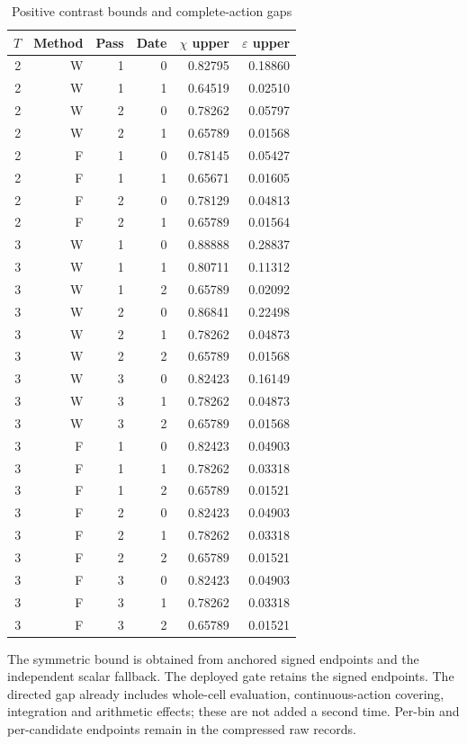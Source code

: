 \begin{table}[htbp]
\centering
\caption{Positive contrast bounds and complete-action gaps}\label{tab:date-bounds54}
{\small\setlength{\tabcolsep}{4pt}
\begin{tabular}{rrrrrr}
\hline
$T$ & Method & Pass & Date & $\chi$ upper & $\varepsilon$ upper \\
\hline
2 & W & 1 & 0 & 0.82795 & 0.18860 \\
2 & W & 1 & 1 & 0.64519 & 0.02510 \\
2 & W & 2 & 0 & 0.78262 & 0.05797 \\
2 & W & 2 & 1 & 0.65789 & 0.01568 \\
2 & F & 1 & 0 & 0.78145 & 0.05427 \\
2 & F & 1 & 1 & 0.65671 & 0.01605 \\
2 & F & 2 & 0 & 0.78129 & 0.04813 \\
2 & F & 2 & 1 & 0.65789 & 0.01564 \\
3 & W & 1 & 0 & 0.88888 & 0.28837 \\
3 & W & 1 & 1 & 0.80711 & 0.11312 \\
3 & W & 1 & 2 & 0.65789 & 0.02092 \\
3 & W & 2 & 0 & 0.86841 & 0.22498 \\
3 & W & 2 & 1 & 0.78262 & 0.04873 \\
3 & W & 2 & 2 & 0.65789 & 0.01568 \\
3 & W & 3 & 0 & 0.82423 & 0.16149 \\
3 & W & 3 & 1 & 0.78262 & 0.04873 \\
3 & W & 3 & 2 & 0.65789 & 0.01568 \\
3 & F & 1 & 0 & 0.82423 & 0.04903 \\
3 & F & 1 & 1 & 0.78262 & 0.03318 \\
3 & F & 1 & 2 & 0.65789 & 0.01521 \\
3 & F & 2 & 0 & 0.82423 & 0.04903 \\
3 & F & 2 & 1 & 0.78262 & 0.03318 \\
3 & F & 2 & 2 & 0.65789 & 0.01521 \\
3 & F & 3 & 0 & 0.82423 & 0.04903 \\
3 & F & 3 & 1 & 0.78262 & 0.03318 \\
3 & F & 3 & 2 & 0.65789 & 0.01521 \\
\hline
\end{tabular}}
\par\smallskip
{\footnotesize The symmetric bound is obtained from anchored signed endpoints and the independent scalar fallback. The deployed gate retains the signed endpoints. The directed gap already includes whole-cell evaluation, continuous-action covering, integration and arithmetic effects; these are not added a second time. Per-bin and per-candidate endpoints remain in the compressed raw records.}
\end{table}
